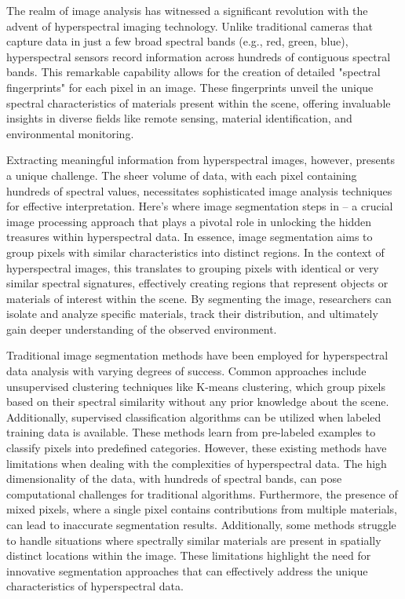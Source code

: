 The realm of image analysis has witnessed a significant revolution with the advent of hyperspectral imaging technology. Unlike traditional cameras that capture data in just a few broad spectral bands (e.g., red, green, blue), hyperspectral sensors record information across hundreds of contiguous spectral bands. This remarkable capability allows for the creation of detailed "spectral fingerprints" for each pixel in an image. These fingerprints unveil the unique spectral characteristics of materials present within the scene, offering invaluable insights in diverse fields like remote sensing, material identification, and environmental monitoring.

Extracting meaningful information from hyperspectral images, however, presents a unique challenge. The sheer volume of data, with each pixel containing hundreds of spectral values, necessitates sophisticated image analysis techniques for effective interpretation. Here's where image segmentation steps in – a crucial image processing approach that plays a pivotal role in unlocking the hidden treasures within hyperspectral data. In essence, image segmentation aims to group pixels with similar characteristics into distinct regions. In the context of hyperspectral images, this translates to grouping pixels with identical or very similar spectral signatures, effectively creating regions that represent objects or materials of interest within the scene. By segmenting the image, researchers can isolate and analyze specific materials, track their distribution, and ultimately gain deeper understanding of the observed environment.

Traditional image segmentation methods have been employed for hyperspectral data analysis with varying degrees of success. Common approaches include unsupervised clustering techniques like K-means clustering, which group pixels based on their spectral similarity without any prior knowledge about the scene. Additionally, supervised classification algorithms can be utilized when labeled training data is available. These methods learn from pre-labeled examples to classify pixels into predefined categories. However, these existing methods have limitations when dealing with the complexities of hyperspectral data. The high dimensionality of the data, with hundreds of spectral bands, can pose computational challenges for traditional algorithms. Furthermore, the presence of mixed pixels, where a single pixel contains contributions from multiple materials, can lead to inaccurate segmentation results. Additionally, some methods struggle to handle situations where spectrally similar materials are present in spatially distinct locations within the image. These limitations highlight the need for innovative segmentation approaches that can effectively address the unique characteristics of hyperspectral data.